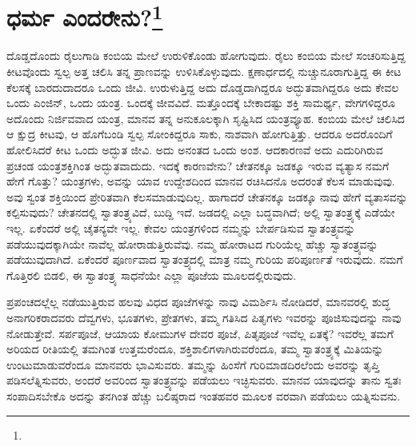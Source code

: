
\chapter{ಧರ್ಮ ಎಂದರೇನು?\protect\footnote{}}

ದೊಡ್ಡದೊಂದು ರೈಲುಗಾಡಿ ಕಂಬಿಯ ಮೇಲೆ ಉರುಳಿಕೊಂಡು ಹೋಗುವುದು. ರೈಲು ಕಂಬಿಯ ಮೇಲೆ ಸಂಚರಿಸುತ್ತಿದ್ದ ಕೀಟವೊಂದು ಸ್ವಲ್ಪ ಅತ್ತ ಚಲಿಸಿ ತನ್ನ ಪ್ರಾಣವನ್ನು ಉಳಿಸಿಕೊಳ್ಳುವುದು. ಕ್ಷಣಾರ್ಧದಲ್ಲಿ ನುಚ್ಚುನೂರಾಗುತ್ತಿದ್ದ ಈ ಕೀಟ ಕೆಲಸಕ್ಕೆ ಬಾರದುದಾದರೂ ಒಂದು ಜೀವಿ. ಉರುಳುತ್ತಿದ್ದ ಅದು ದೊಡ್ಡದಾಗಿದ್ದರೂ ಅದ್ಭುತವಾಗಿದ್ದರೂ ಅದು ಕೇವಲ ಒಂದು ಎಂಜಿನ್, ಒಂದು ಯಂತ್ರ. ಒಂದಕ್ಕೆ ಜೀವವಿದೆ. ಮತ್ತೊಂದಕ್ಕೆ ಬೇಕಾದಷ್ಟು ಶಕ್ತಿ ಸಾಮರ್ಥ್ಯ, ವೇಗಗಳಿದ್ದರೂ ಅದೊಂದು ನಿರ್ಜಿವವಾದ ಯಂತ್ರ, ಮಾನವ ತನ್ನ ಅನುಕೂಲಕ್ಕಾಗಿ ಸೃಷ್ಟಿಸಿದ ಯಂತ್ರವ್ಯೂಹ. ಕಂಬಿಯ ಮೇಲೆ ಚಲಿಸಿದ ಆ ಕ್ಷುದ್ರ ಕೀಟವು, ಆ ಹೊಗೆಬಂಡಿ ಸ್ವಲ್ಪ ಸೋಂಕಿದ್ದರೂ ಸಾಕು, ನಾಶವಾಗಿ ಹೋಗುತ್ತಿತ್ತು. ಆದರೂ ಅದರೊಂದಿಗೆ ಹೋಲಿಸಿದರೆ ಕೀಟ ಒಂದು ಅದ್ಭುತ ಜೀವಿ. ಅದು ಅನಂತದ ಒಂದು ಅಂಶ. ಆದಕಾರಣವೆ ಅದು ಎದುರಿಗಿರುವ ಪ್ರಚಂಡ ಯಂತ್ರಶಕ್ತಿಗಿಂತ ಅದ್ಭುತವಾದುದು. ಇದಕ್ಕೆ ಕಾರಣವೇನು? ಚೇತನಕ್ಕೂ ಜಡಕ್ಕೂ ಇರುವ ವ್ಯತ್ಯಾಸ ನಮಗೆ ಹೇಗೆ ಗೊತ್ತು? ಯಂತ್ರಗಳು, ಅವನ್ನು ಯಾವ ಉದ್ದೇಶದಿಂದ ಮಾನವ ರಚಿಸಿದನೊ ಅದರಂತೆ ಕೆಲಸ ಮಾಡುವುವು. ಅವು ಸ್ವಂತ ಶಕ್ತಿಯಿಂದ ಪ್ರೇರಿತವಾಗಿ ಕೆಲಸಮಾಡುವುದಿಲ್ಲ. ಹಾಗಾದರೆ ಚೇತನಕ್ಕೂ ಜಡಕ್ಕೂ ನಾವು ಹೇಗೆ ವ್ಯತಾಸವನ್ನು ಕಲ್ಪಿಸುವುದು? ಚೇತನದಲ್ಲಿ ಸ್ವಾತಂತ್ರ್ಯವಿದೆ, ಬುದ್ದಿ ಇದೆ. ಜಡದಲ್ಲಿ ಎಲ್ಲಾ ಬದ್ಧವಾಗಿದೆ; ಅಲ್ಲಿ ಸ್ವಾತಂತ್ರ್ಯಕ್ಕೆ ಎಡೆಯೇ ಇಲ್ಲ. ಏಕೆಂದರೆ ಅಲ್ಲಿ ಚೈತನ್ಯವೇ ಇಲ್ಲ. ಕೇವಲ ಯಂತ್ರಗಳಿಂದ ನಮ್ಮನ್ನು ಬೇರ್ಪಡಿಸುವ ಸ್ವಾತಂತ್ರ್ಯವನ್ನು ಪಡೆಯುವುದಕ್ಕಾಗಿಯೇ ನಾವೆಲ್ಲ ಹೋರಾಡುತ್ತಿರುವೆವು. ನಮ್ಮ ಹೋರಾಟದ ಗುರಿಯೆಲ್ಲ ಹೆಚ್ಚು ಸ್ವಾತಂತ್ರ್ಯವನ್ನು ಪಡೆಯುವುದಾಗಿದೆ. ಏಕೆಂದರೆ ಪೂರ್ಣವಾದ ಸ್ವಾತಂತ್ರ್ಯದಲ್ಲಿ ಮಾತ್ರ ನಮ್ಮ ಗುರಿಯ ಪರಿಪೂರ್ಣತೆ ಇರುವುದು. ನಮಗೆ ಗೊತ್ತಿರಲಿ ಬಿಡಲಿ, ಈ ಸ್ವಾತಂತ್ರ್ಯ ಸಾಧನೆಯೇ ಎಲ್ಲಾ ಪೂಜೆಯ ಮೂಲದಲ್ಲಿರುವುದು.

ಪ್ರಪಂಚದಲ್ಲೆಲ್ಲ ನಡೆಯುತ್ತಿರುವ ಹಲವು ವಿಧದ ಪೂಜೆಗಳನ್ನು ನಾವು ವಿಮರ್ಶಿಸಿ ನೋಡಿದರೆ, ಮಾನವರಲ್ಲಿ ಶುದ್ಧ ಅನಾಗರಿಕರಾದವರು ದೆವ್ವಗಳು, ಭೂತಗಳು, ಪ್ರೇತಗಳು, ತಮ್ಮ ಗತಿಸಿದ ಪಿತೃಗಳು ಇವರನ್ನು ಪೂಜಿಸುವುದನ್ನು ನಾವು ನೋಡುತ್ತೇವೆ. ಸರ್ಪಪೂಜೆ, ಆಯಾಯ ಕೋಮುಗಳ ದೇವರ ಪೂಜೆ, ಪಿತೃಪೂಜೆ ಇವೆಲ್ಲ ಏತಕ್ಕೆ? ಇವರೆಲ್ಲ ತಮಗೆ ಅರಿಯದ ರೀತಿಯಲ್ಲಿ ತಮಗಿಂತ ಉತ್ತಮರೆಂದೂ, ಶಕ್ತಿಶಾಲಿಗಳಾಗಿರುವರೆಂದೂ, ತಮ್ಮ ಸ್ವಾತಂತ್ರ್ಯಕ್ಕೆ ಮಿತಿಯನ್ನು ಉಂಟುಮಾಡುವರೆಂದೂ ಮಾನವರು ಭಾವಿಸುವರು. ತಮ್ಮನ್ನು ಹಿಂಸೆಗೆ ಗುರಿಮಾಡದಿರಲೆಂದು ಅವರನ್ನು ತೃಪ್ತಿ ಪಡಿಸಲೆತ್ನಿಸುವರು, ಅಂದರೆ ಅವರಿಂದ ಸ್ವಾತಂತ್ರ್ಯವನ್ನು ಪಡೆಯಲು ಇಚ್ಛಿಸುವರು. ಮಾನವ ಯಾವುದನ್ನು ತಾನು ಸ್ವತಃ ಸಂಪಾದಿಸಬೇಕೊ ಅದನ್ನು ತನಗಿಂತ ಹೆಚ್ಚು ಬಲಿಷ್ಠರಾದ ಇಂತಹವರ ಮೂಲಕ ವರವಾಗಿ ಪಡೆಯಲು ಯತ್ನಿಸುವನು.

